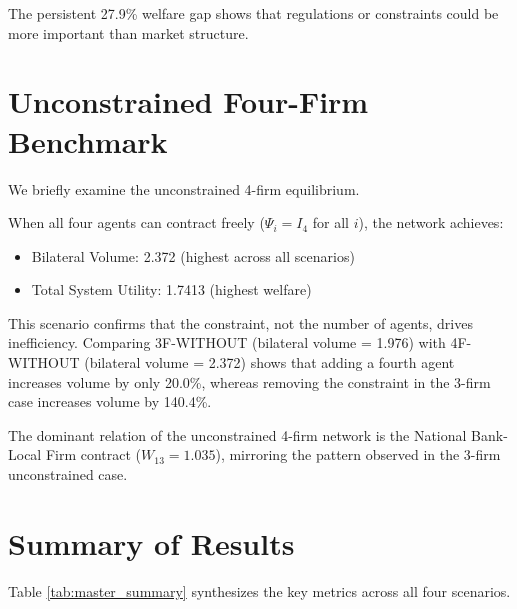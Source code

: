 The persistent 27.9\% welfare gap shows that regulations or constraints could be more important than market structure. 

\section{Unconstrained Four-Firm Benchmark}
\label{sec:noconstaint_4f}

We briefly examine the unconstrained 4-firm equilibrium.

When all four agents can contract freely ($\Psi_i = I_4$ for all $i$), the network achieves:
\begin{itemize}
    \item Bilateral Volume: 2.372 (highest across all scenarios)
    \item Total System Utility: 1.7413 (highest welfare)
\end{itemize}

This scenario confirms that the constraint, not the number of agents, drives inefficiency. Comparing 3F-WITHOUT (bilateral volume = 1.976) with 4F-WITHOUT (bilateral volume = 2.372) shows that adding a fourth agent increases volume by only 20.0\%, whereas removing the constraint in the 3-firm case increases volume by 140.4\%.

The dominant relation of the unconstrained 4-firm network is the National Bank-Local Firm contract ($W_{13} = 1.035$), mirroring the pattern observed in the 3-firm unconstrained case. 

\section{Summary of Results}
\label{sec:summary_results}

Table \ref{tab:master_summary} synthesizes the key metrics across all four scenarios.

